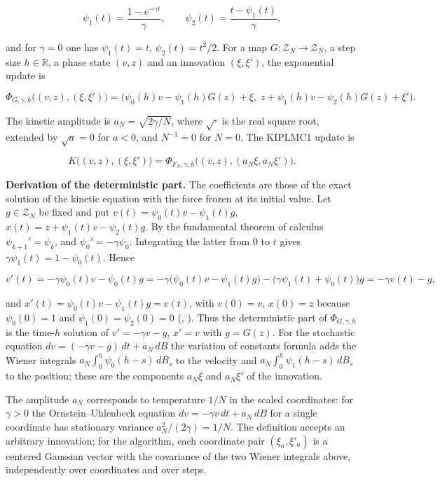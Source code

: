 \documentclass[11pt,a4paper]{report}
\begin{document}
\[\psi_1(t)=\frac{1-e^{-\gamma t}}{\gamma},\qquad\psi_2(t)=\frac{t-\psi_1(t)}{\gamma},\]


and for \(\gamma=0\) one has \(\psi_1(t)=t\), \(\psi_2(t)=t^2/2\). For a map \(G:\mathcal Z_N\to\mathcal Z_N\), a step size \(h\in\mathbb R\), a phase state \((v,z)\) and an innovation \((\xi,\xi')\), the exponential update is


\[\Phi_{G,\gamma,h}\bigl((v,z),(\xi,\xi')\bigr)=\bigl(\psi_0(h)v-\psi_1(h)G(z)+\xi,\;z+\psi_1(h)v-\psi_2(h)G(z)+\xi'\bigr).\]


The kinetic amplitude is \(a_N=\sqrt{2\gamma/N}\), where \(\sqrt{\cdot}\) is the real square root, extended by \(\sqrt a=0\) for \(a<0\), and \(N^{-1}=0\) for \(N=0\). The KIPLMC1 update is


\[K\bigl((v,z),(\xi,\xi')\bigr)=\Phi_{F_N,\gamma,h}\bigl((v,z),(a_N\xi,a_N\xi')\bigr).\]


\textbf{Derivation of the deterministic part.} The coefficients are those of the exact solution of the kinetic equation with the force frozen at its initial value. Let \(g\in\mathcal Z_N\) be fixed and put \(v(t)=\psi_0(t)v-\psi_1(t)g\), \(x(t)=z+\psi_1(t)v-\psi_2(t)g\). By the fundamental theorem of calculus \(\psi_{k+1}'=\psi_k\), and \(\psi_0'=-\gamma\psi_0\). Integrating the latter from \(0\) to \(t\) gives \(\gamma\psi_1(t)=1-\psi_0(t)\). Hence


\[v'(t)=-\gamma\psi_0(t)v-\psi_0(t)g=-\gamma\bigl(\psi_0(t)v-\psi_1(t)g\bigr)-\bigl(\gamma\psi_1(t)+\psi_0(t)\bigr)g=-\gamma v(t)-g,\]


and \(x'(t)=\psi_0(t)v-\psi_1(t)g=v(t)\), with \(v(0)=v\), \(x(0)=z\) because \(\psi_0(0)=1\) and \(\psi_1(0)=\psi_2(0)=0\) (\cite[Section~3.12.1]{LangevinLean2026Kinetic}, \cite[Section~3.12.1]{LangevinLean2026Kinetic}). Thus the deterministic part of \(\Phi_{G,\gamma,h}\) is the time-\(h\) solution of \(v'=-\gamma v-g\), \(x'=v\) with \(g=G(z)\). For the stochastic equation \(dv=(-\gamma v-g)\,dt+a_N\,dB\) the variation of constants formula adds the Wiener integrals \(a_N\int_0^h\psi_0(h-s)\,dB_s\) to the velocity and \(a_N\int_0^h\psi_1(h-s)\,dB_s\) to the position; these are the components \(a_N\xi\) and \(a_N\xi'\) of the innovation.




The amplitude \(a_N\) corresponds to temperature \(1/N\) in the scaled coordinates: for \(\gamma>0\) the Ornstein–Uhlenbeck equation \(dv=-\gamma v\,dt+a_N\,dB\) for a single coordinate has stationary variance \(a_N^2/(2\gamma)=1/N\). The definition accepts an arbitrary innovation; for the algorithm, each coordinate pair \((\xi_a,\xi'_a)\) is a centered Gaussian vector with the covariance of the two Wiener integrals above, independently over coordinates and over steps.
\end{document}
